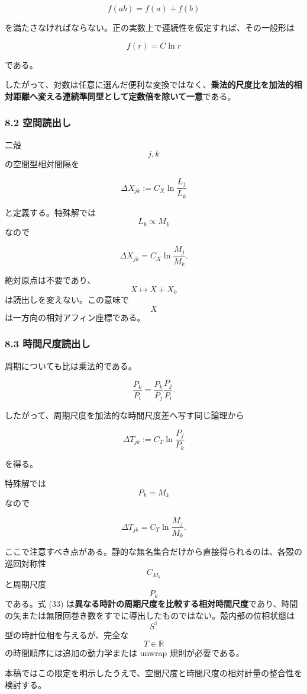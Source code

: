 \documentclass[
  a4paper,
]{ltjsarticle}
\begin{document}
\[
f(ab)=f(a)+f(b)
\]

を満たさなければならない。正の実数上で連続性を仮定すれば、その一般形は

\[
\boxed{
f(r)=C\ln r
}
\tag{30}
\]

である。

したがって、対数は任意に選んだ便利な変換ではなく、\textbf{乗法的尺度比を加法的相対距離へ変える連続準同型として定数倍を除いて一意}である。

\subsubsection{8.2 空間読出し}\label{ux7a7aux9593ux8aadux51faux3057}

二殻 \[j,k\] の空間型相対間隔を

\[
\boxed{
\Delta X_{jk}
:=
C_X\ln\frac{L_j}{L_k}
}
\tag{31}
\]

と定義する。特殊解では \[L_k\propto M_k\] なので

\[
\Delta X_{jk}
=
C_X\ln\frac{M_j}{M_k}.
\tag{32}
\]

絶対原点は不要であり、\[X\mapsto X+X_0\] は読出しを変えない。この意味で
\[X\] は一方向の相対アフィン座標である。

\subsubsection{8.3
時間尺度読出し}\label{ux6642ux9593ux5c3aux5ea6ux8aadux51faux3057}

周期についても比は乗法的である。

\[
\frac{P_k}{P_i}
=
\frac{P_k}{P_j}\frac{P_j}{P_i}.
\]

したがって、周期尺度を加法的な時間尺度差へ写す同じ論理から

\[
\boxed{
\Delta T_{jk}
:=
C_T\ln\frac{P_j}{P_k}
}
\tag{33}
\]

を得る。

特殊解では \[P_k=M_k\] なので

\[
\Delta T_{jk}
=
C_T\ln\frac{M_j}{M_k}.
\tag{34}
\]

ここで注意すべき点がある。静的な無名集合だけから直接得られるのは、各殻の巡回対称性
\[C_{M_k}\] と周期尺度 \[P_k\] である。式 (33)
は\textbf{異なる時計の周期尺度を比較する相対時間尺度}であり、時間の矢または無限回巻き数をすでに導出したものではない。殻内部の位相状態は
\[S^1\] 型の時計位相を与えるが、完全な \[T\in\mathbb R\]
の時間順序には追加の動力学または unwrap 規則が必要である。

本稿ではこの限定を明示したうえで、空間尺度と時間尺度の相対計量の整合性を検討する。
\end{document}
